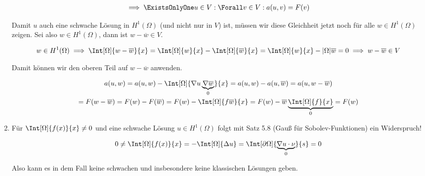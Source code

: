 \begin{solution}
\begin{enumerate}[label = \alph*)]
    \begin{align*}
        \implies
        \ExistsOnlyOne u \in V:
        \Forall v \in V:
        a(u, v) = F(v)
    \end{align*}

    Damit $u$ auch eine schwache Lösung in $H^1(\Omega)$ (und nicht nur in $V$) ist, müssen wir diese Gleichheit jetzt noch für alle $w \in H^1(\Omega)$ zeigen.
    Sei also $w \in H^1(\Omega)$, dann ist $w - \overline{w} \in V$.

    \begin{align*}
        w \in H^1(\Omega)
        \implies
        \Int[\Omega]{w - \overline{w}}{x}
        =
        \Int[\Omega]{w}{x} - \Int[\Omega]{\overline{w}}{x}
        =
        \Int[\Omega]{w}{x} - |\Omega| \overline{w}
        =
        0
        \implies
        w - \overline{w} \in V
    \end{align*}

    Damit können wir den oberen Teil auf $w - \overline{w}$ anwenden.

    \begin{multline*}
        a(u, w)
        =
        a(u, w) - \Int[\Omega]{\nabla u \underbrace{\nabla \overline{w}}_0}{x}
        =
        a(u, w) - a(u, \overline{w})
        =
        a(u, w - \overline{w}) \\
        =
        F(w - \overline{w})
        =
        F(w) - F(\overline{w})
        =
        F(w) - \Int[\Omega]{f \overline{w}}{x}
        =
        F(w) - \overline{w} \underbrace{\Int[\Omega]{f}{x}}_0
        =
        F(w)
    \end{multline*}

    \item Für $\Int[\Omega]{f(x)}{x} \neq 0$ und eine schwache Lösung $u \in H^1(\Omega)$ folgt mit Satz 5.8 (Gauß für Sobolev-Funktionen) ein Widerspruch!

    \begin{align*}
        0
        \neq
        \Int[\Omega]{f(x)}{x}
        =
        -\Int[\Omega]{\Delta u}
        =
        \Int[\partial \Omega]{\underbrace{\nabla u \cdot \nu}_0}{s}
        =
        0
    \end{align*}

    Also kann es in dem Fall keine schwachen und insbesondere keine klassischen Lösungen geben.

\end{enumerate}

\end{solution}

